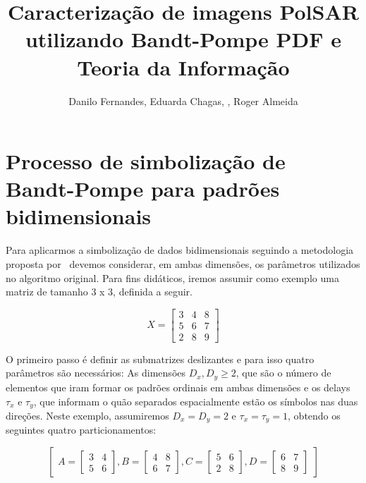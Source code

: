 \documentclass[12pt]{article}
\title{Caracterização de imagens PolSAR utilizando Bandt-Pompe PDF e Teoria da Informação}
\author{Danilo Fernandes\inst{1}, Eduarda Chagas\inst{2}, , Roger Almeida\inst{1}}
\begin{document}
\maketitle

\section{Processo de simbolização de Bandt-Pompe para padrões bidimensionais}

Para aplicarmos a simbolização de dados bidimensionais seguindo a metodologia proposta por~\cite{Bandt2002Permutation} devemos considerar, em ambas dimensões, os parâmetros utilizados no algoritmo original. Para fins didáticos, iremos assumir como exemplo uma matriz de tamanho $3$ x $3$, definida a seguir.

\begin{center}
$$
X = \left[
\begin{array}{ccc}
3 & 4 & 8 \\
5 & 6 & 7 \\
2 & 8 & 9 
\end{array}
\right]
$$
\end{center}

O primeiro passo é definir as submatrizes deslizantes e para isso quatro parâmetros são necessários: As dimensões $D_{x}, D_{y} \geq 2$, que são o número de elementos que iram formar os padrões ordinais em ambas dimensões e os delays $\tau _{x}$ e $\tau_{y}$, que informam o quão separados espacialmente estão os símbolos nas duas direções. Neste exemplo, assumiremos $D_{x} = D_{y} = 2$ e $\tau_{x} = \tau_{y} = 1$, obtendo os seguintes quatro particionamentos:

\[
\begin{bmatrix}

A = \left[
\begin{array}{cc}
3 & 4 \\
5 & 6 
\end{array}
\right],

B = \left[
\begin{array}{cc}
4 & 8 \\
6 & 7 
\end{array}
\right],

C = \left[
\begin{array}{cc}
5 & 6 \\
2 & 8 
\end{array}
\right],

D = \left[
\begin{array}{cc}
6 & 7 \\
8 & 9 
\end{array}
\right]

\end{bmatrix}
\]
\end{document}

